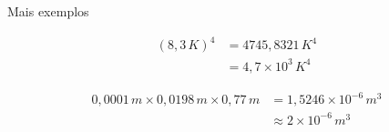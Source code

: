 \documentclass[aspectratio=169,10pt]{beamer}
\begin{document}

\begin{frame}{Mais exemplos}

\begin{align*}
(8,3\,K)^4 &= 4745,8321\,K^4 \\
&= 4,7\times10^3\,K^4
\end{align*}

\begin{align*}
0,0001\,m \times 0,0198\,m \times 0,77\,m
&= 1,5246\times10^{-6}\,m^3 \\
&\approx 2\times10^{-6}\,m^3
\end{align*}

\end{frame}
\end{document}
